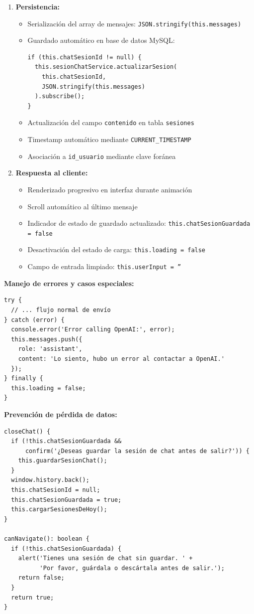 \documentclass[12pt,a4paper]{report}
\numberwithin{figure}{section}
\begin{document}
\begin{enumerate}
  \item \textbf{Persistencia:}
  \begin{itemize}
    \item Serialización del array de mensajes: \texttt{JSON.stringify(this.messages)}
    \item Guardado automático en base de datos MySQL:
    \begin{lstlisting}[style=angelcode]
if (this.chatSesionId != null) {
  this.sesionChatService.actualizarSesion(
    this.chatSesionId, 
    JSON.stringify(this.messages)
  ).subscribe();
}
    \end{lstlisting}
    \item Actualización del campo \texttt{contenido} en tabla \texttt{sesiones}
    \item Timestamp automático mediante \texttt{CURRENT\_TIMESTAMP}
    \item Asociación a \texttt{id\_usuario} mediante clave foránea
  \end{itemize}
  
  \item \textbf{Respuesta al cliente:}
  \begin{itemize}
    \item Renderizado progresivo en interfaz durante animación
    \item Scroll automático al último mensaje
    \item Indicador de estado de guardado actualizado: \texttt{this.chatSesionGuardada = false}
    \item Desactivación del estado de carga: \texttt{this.loading = false}
    \item Campo de entrada limpiado: \texttt{this.userInput = ''}
  \end{itemize}
\end{enumerate}

\textbf{Manejo de errores y casos especiales:}

\begin{lstlisting}[style=angelcode,caption={Error handling en sendMessage()}]
try {
  // ... flujo normal de envío
} catch (error) {
  console.error('Error calling OpenAI:', error);
  this.messages.push({
    role: 'assistant', 
    content: 'Lo siento, hubo un error al contactar a OpenAI.'
  });
} finally {
  this.loading = false;
}
\end{lstlisting}

\textbf{Prevención de pérdida de datos:}

\begin{lstlisting}[style=angelcode,caption={Proteccion al cerrar sesion}]
closeChat() {
  if (!this.chatSesionGuardada && 
      confirm('¿Deseas guardar la sesión de chat antes de salir?')) {
    this.guardarSesionChat();
  }
  window.history.back();
  this.chatSesionId = null;
  this.chatSesionGuardada = true;
  this.cargarSesionesDeHoy();
}

canNavigate(): boolean {
  if (!this.chatSesionGuardada) {
    alert('Tienes una sesión de chat sin guardar. ' +
          'Por favor, guárdala o descártala antes de salir.');
    return false;
  }
  return true;
}
\end{lstlisting}
\end{document}
